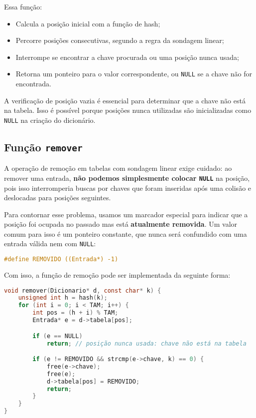 Essa função:

\begin{itemize}
  \item Calcula a posição inicial com a função de hash;
  \item Percorre posições consecutivas, segundo a regra da sondagem linear;
  \item Interrompe se encontrar a chave procurada ou uma posição nunca usada;
  \item Retorna um ponteiro para o valor correspondente, ou \texttt{NULL} se a chave não for encontrada.
\end{itemize}

A verificação de posição vazia é essencial para determinar que a chave não está na tabela. 
Isso é possível porque posições nunca utilizadas são inicializadas como \texttt{NULL} na criação do dicionário.

\subsection*{Função \texttt{remover}}

A operação de remoção em tabelas com sondagem linear exige cuidado: ao remover uma entrada, \textbf{não podemos simplesmente colocar \texttt{NULL}} na posição, pois isso interromperia buscas por chaves que foram inseridas após uma colisão e deslocadas para posições seguintes.

Para contornar esse problema, usamos um marcador especial para indicar que a posição foi ocupada no passado mas está \textbf{atualmente removida}. 
Um valor comum para isso é um ponteiro constante, que nunca será confundido com uma entrada válida nem com \texttt{NULL}:

\begin{lstlisting}[language=C, caption={Marcador especial para posição removida}]
#define REMOVIDO ((Entrada*) -1)
\end{lstlisting}

Com isso, a função de remoção pode ser implementada da seguinte forma:

\begin{lstlisting}[language=C, caption={Remoção com sondagem linear}]
void remover(Dicionario* d, const char* k) {
    unsigned int h = hash(k);
    for (int i = 0; i < TAM; i++) {
        int pos = (h + i) % TAM;
        Entrada* e = d->tabela[pos];

        if (e == NULL)
            return; // posição nunca usada: chave não está na tabela

        if (e != REMOVIDO && strcmp(e->chave, k) == 0) {
            free(e->chave);
            free(e);
            d->tabela[pos] = REMOVIDO;
            return;
        }
    }
}
\end{lstlisting}

